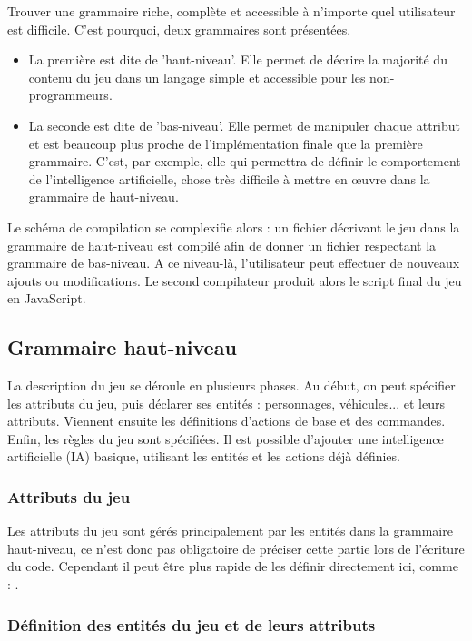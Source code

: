 Trouver une grammaire riche, complète et accessible à n'importe quel utilisateur est difficile.
C'est pourquoi, deux grammaires sont présentées.
\begin{itemize}
 \item La première est dite de 'haut-niveau'.
Elle permet de décrire la majorité du contenu du jeu dans un langage simple et accessible pour les non-programmeurs.
 \item La seconde est dite de 'bas-niveau'.
Elle permet de manipuler chaque attribut et est beaucoup plus proche de l'implémentation finale que la première grammaire.
C'est, par exemple, elle qui permettra de définir le comportement de l'intelligence artificielle, chose très difficile à mettre en œuvre dans la grammaire de haut-niveau.
\end{itemize}

Le schéma de compilation se complexifie alors : un fichier décrivant le jeu dans la grammaire de haut-niveau est compilé afin de donner un fichier
respectant la grammaire de bas-niveau. A ce niveau-là, l'utilisateur peut effectuer de nouveaux ajouts ou modifications. Le second compilateur
produit alors le script final du jeu en JavaScript.

\subsection{Grammaire haut-niveau}

La description du jeu se déroule en plusieurs phases.
Au début, on peut spécifier les attributs du jeu, puis déclarer ses entités : personnages, véhicules... et leurs attributs. 
Viennent ensuite les définitions d'actions de base et des commandes.
Enfin, les règles du jeu sont spécifiées.
Il est possible d'ajouter une intelligence artificielle (IA) basique, utilisant les entités et les actions déjà définies.

\subsubsection{Attributs du jeu}

Les attributs du jeu sont gérés principalement par les entités dans la grammaire haut-niveau, ce n'est donc pas obligatoire 
de préciser cette partie lors de l'écriture du code. Cependant il peut être plus rapide de les définir directement ici, comme :
.

\subsubsection{Définition des entités du jeu et de leurs attributs}

